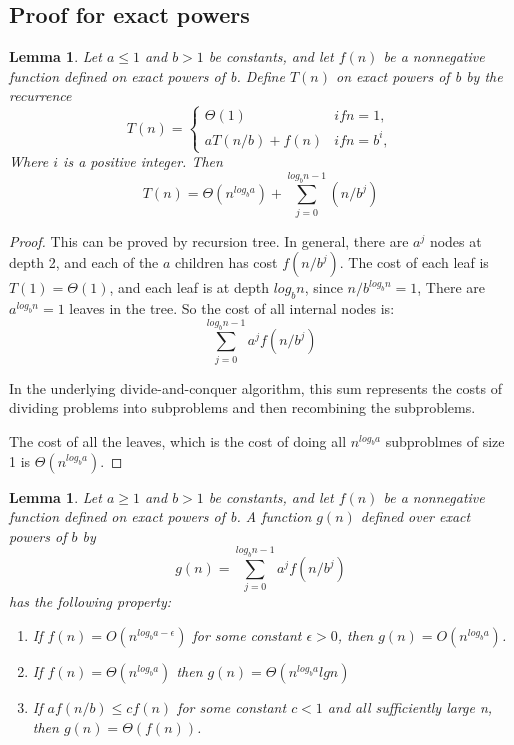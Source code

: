 \documentclass[a4paper,11pt]{book}
\newtheorem{lemma}[theorem]{Lemma}
\begin{document}
\subsection{Proof for exact powers}
\begin{lemma}
Let $a\leq 1$ and $b>1$ be constants, and let $f(n)$ be a nonnegative function defined on exact powers of b. Define $T(n)$ on exact powers of b by the recurrence
\[T(n)=\begin{cases}
\Theta(1) & if n=1,\\
aT(n/b) + f(n) & if n = b^i,
\end{cases}\]
Where $i$ is a positive integer. Then
\[T(n) = \Theta(n^{log_ba})+\sum_{j=0}^{log_bn-1}(n/b^j)\]
\end{lemma}
\begin{proof}
This can be proved by recursion tree. In general, there are $a^j$ nodes at depth 2, and each of the $a$ children has cost $f(n/b^j)$. The cost of each leaf is $T(1)=\Theta (1)$, and each leaf is at depth $log_bn$, since $n/b^{log_bn}=1$, There are $a^{log_bn}=1$ leaves in the tree. So the cost of all internal nodes is:
\[ \sum^{log_bn-1}_{j=0}a^jf(n/b^j)\]

In the underlying divide-and-conquer algorithm, this sum represents the costs of dividing problems into subproblems and then recombining the subproblems.

The cost of all the leaves, which is the cost of doing all $n^{log_ba}$ subproblmes of size 1 is $\Theta(n^{log_ba})$.
\end{proof}
\begin{lemma}
Let $a \geq 1$ and $b > 1$ be constants, and let $f(n)$ be a nonnegative function defined on exact powers of b. A function $g(n)$ defined over exact powers of $b$ by \[g(n) = \sum^{log_bn-1}_{j=0}a^jf(n/b^j) \]
has the following property:
\begin{enumerate}
\item If $f(n)=O(n^{log_ba-\epsilon})$ for some constant $\epsilon > 0$, then $g(n)=O(n^{log_ba})$.
\item If $f(n)=\Theta(n^{log_ba})$ then $g(n)=\Theta(n^{log_ba} lgn)$
\item If $af(n/b)\leq cf(n)$ for some constant $c<1$ and all sufficiently large n, then $g(n)=\Theta(f(n))$. 
\end{enumerate}
\end{lemma}
\end{document}
